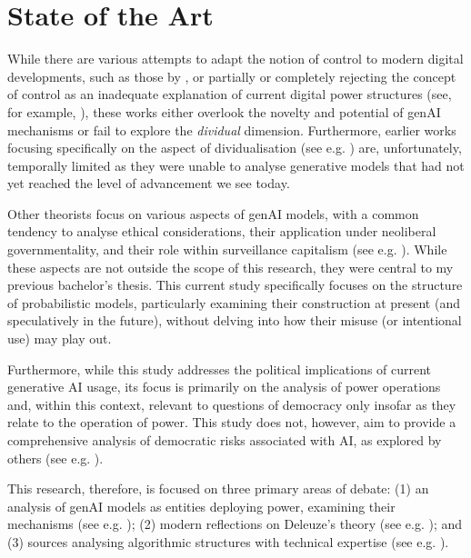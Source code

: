 \section{State of the Art}
While there are various attempts to adapt the notion of control to modern
digital developments, such as those by \cite{brusseau2020}, or partially or completely rejecting the concept of control as an inadequate explanation of current digital power structures (see, for example, \cite{hui2015}), these works either overlook the novelty and potential of genAI mechanisms or fail to explore the \textit{dividual} dimension.  Furthermore, earlier works focusing specifically on the aspect of dividualisation (see e.g. \cite{Cheney2011, Otterlo2013}) are, unfortunately, temporally limited as they were unable to analyse generative models that had not yet reached the level of advancement we see today.

Other theorists focus on various aspects of genAI models, with a common tendency to analyse ethical considerations, their application under neoliberal governmentality, and their role within surveillance capitalism (see e.g. \cite{zuboff2019, gillespie2024, Haggerty2000}). While these aspects are not outside the scope of this research, they were central to my previous bachelor's thesis.  This current study specifically focuses on the structure of probabilistic models, particularly examining their construction at present (and speculatively in the future), without delving into how their misuse (or intentional use) may play out.

Furthermore, while this study addresses the political implications of current generative AI usage, its focus is primarily on the analysis of power operations and, within this context, relevant to questions of democracy only insofar as they relate to the operation of power.  This study does not, however, aim to provide a comprehensive analysis of democratic risks associated with AI, as explored by others (see e.g. \cite{zarkadakes2020, coeckelbergh2024}).

This research, therefore, is focused on three primary areas of debate: (1) an analysis of genAI models as entities deploying power, examining their mechanisms (see e.g. \cite{amoore2024, konik2015, mackenzie2021}); (2) modern reflections on Deleuze's theory (see e.g. \cite{mischke2021c, poster2010}); and (3) sources analysing algorithmic structures with technical expertise (see e.g. \cite{vaswani, bender2021b}).


